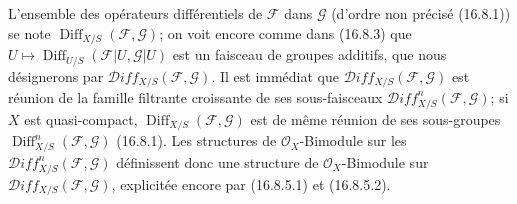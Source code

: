 \begin{env}[16.8.7]
\label{IV.16.8.7}
L'ensemble des opérateurs différentiels de $\mathscr{F}$ dans $\mathscr{G}$
(d'ordre non précisé (16.8.1)) se note
$\operatorname{Diff}_{X/S}(\mathscr{F},\mathscr{G})$; on voit encore comme
dans (16.8.3) que
$U\mapsto\operatorname{Diff}_{U/S}(\mathscr{F}|U,\mathscr{G}|U)$ est un
faisceau de groupes additifs, que nous désignerons par
$\mathscr{D}\!iff_{X/S}(\mathscr{F},\mathscr{G})$. Il est immédiat que
$\mathscr{D}\!iff_{X/S}(\mathscr{F},\mathscr{G})$ est réunion de la famille
filtrante croissante de ses sous-faisceaux
$\mathscr{D}\!iff_{X/S}^n(\mathscr{F},\mathscr{G})$; si $X$ est
quasi-compact, $\operatorname{Diff}_{X/S}(\mathscr{F},\mathscr{G})$
est de même réunion de ses sous-groupes
$\operatorname{Diff}_{X/S}^n(\mathscr{F},\mathscr{G})$ (16.8.1). Les
structures de $\mathcal{O}_X$-Bimodule sur les
$\mathscr{D}\!iff_{X/S}^n(\mathscr{F},\mathscr{G})$ définissent donc une
structure de $\mathcal{O}_X$-Bimodule sur
$\mathscr{D}\!iff_{X/S}(\mathscr{F},\mathscr{G})$, explicitée encore par
(16.8.5.1) et (16.8.5.2).


\end{env}
